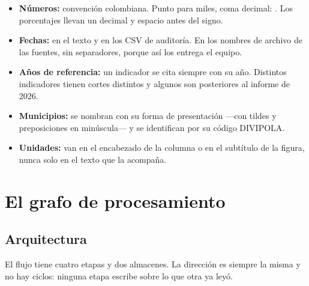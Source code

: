 \documentclass[11pt,a4paper]{article}
\begin{document}
\begin{itemize}[leftmargin=*, itemsep=2pt]
  \item \textbf{Números:} convención colombiana. Punto para miles, coma decimal:
    . Los porcentajes llevan un decimal y espacio antes del signo.
  \item \textbf{Fechas:}  en el texto y en los CSV de auditoría.
    En los nombres de archivo de las fuentes,  sin separadores,
    porque así los entrega el equipo.
  \item \textbf{Años de referencia:} un indicador se cita siempre con su año.
    Distintos indicadores tienen cortes distintos y algunos son posteriores al
    informe de 2026.
  \item \textbf{Municipios:} se nombran con su forma de presentación —con tildes
    y preposiciones en minúscula— y se identifican por su código DIVIPOLA.
  \item \textbf{Unidades:} van en el encabezado de la columna o en el subtítulo
    de la figura, nunca solo en el texto que la acompaña.
\end{itemize}

\section{El grafo de procesamiento}
\label{sec:dag}

\subsection{Arquitectura}

El flujo tiene cuatro etapas y dos almacenes. La dirección es siempre la misma y
no hay ciclos: ninguna etapa escribe sobre lo que otra ya leyó.
\end{document}

